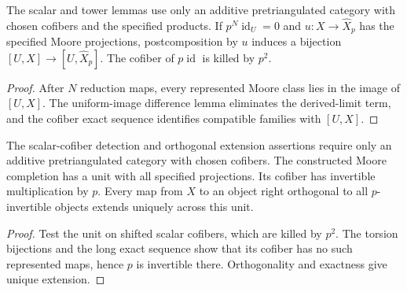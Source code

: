 \begin{proposition}
  \label{prop:moore-completion-torsion}
  \leanok
  The scalar and tower lemmas use only an additive pretriangulated category
  with chosen cofibers and the specified products.
  If $p^N\operatorname{id}_U=0$ and $u:X\to\widehat X_p$
  has the specified Moore projections, postcomposition by $u$ induces
  a bijection $[U,X]\to[U,\widehat X_p]$. The cofiber of
  $p\operatorname{id}$ is killed by $p^2$.
\end{proposition}
\begin{proof}
  After $N$ reduction maps, every represented Moore class lies in
  the image of $[U,X]$. The uniform-image difference lemma eliminates
  the derived-limit term, and the cofiber exact sequence identifies
  compatible families with $[U,X]$.
  \leanok
\end{proof}

\begin{proposition}
  \label{prop:moore-completion-universal}
  \leanok
  The scalar-cofiber detection and orthogonal extension assertions require
  only an additive pretriangulated category with chosen cofibers.
  The constructed Moore completion has a unit with all specified
  projections. Its cofiber has invertible multiplication by $p$.
  Every map from $X$ to an object right orthogonal to all
  $p$-invertible objects extends uniquely across this unit.
\end{proposition}
\begin{proof}
  Test the unit on shifted scalar cofibers, which are killed by
  $p^2$. The torsion bijections and the long exact sequence show
  that its cofiber has no such represented maps, hence $p$ is
  invertible there. Orthogonality and exactness give unique extension.
  \leanok
\end{proof}


